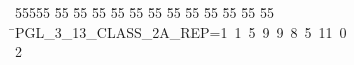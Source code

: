 %
%
\begin{tabbing}
55555 \= 55 \= 55 \= 55 \= 55 \= 55 \= 55 \= 55 \= 55 \= 55 \= 55 \= 55 \= 55 \= \>PGL\_3\_13\_CLASS\_2A\_REP=1\ 1\ 5\ 9\ 9\ 8\ 5\ 11\ 0\\[0pt]
2\>\end{tabbing}
